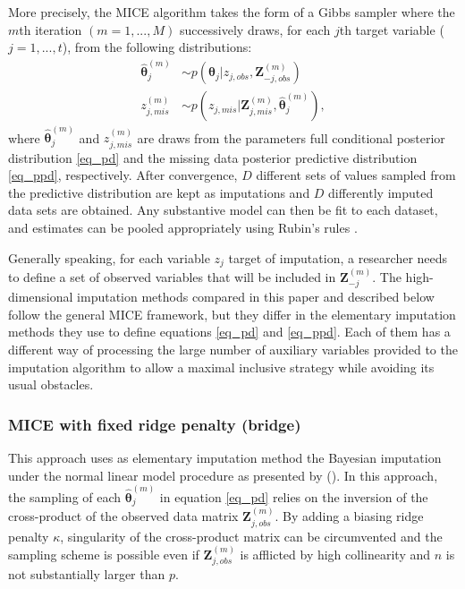 More precisely, the MICE algorithm takes the form of a Gibbs sampler where the $m$th iteration $(m = 1, ..., M)$
successively draws, for each $j$th target variable ($j = 1, ..., t$), from the following distributions:
%
	\begin{align}
	\hat{\bm{\theta}}_{j}^{(m)} &\sim 
		p(\bm{\theta}_j | z_{j, obs}, \bm{Z}_{-j, obs}^{(m)}) 
		\label{eq_pd}\\
	z_{j, mis}^{(m)} &\sim 
		p(z_{j, mis} | \bm{Z}_{j, mis}^{(m)}, \hat{\bm{\theta}}_{j}^{(m)}) 
		\label{eq_ppd},
	\end{align}
%
where $\hat{\bm{\theta}}_{j}^{(m)}$ and $z_{j, mis}^{(m)}$ are draws from the parameters full conditional posterior 
distribution \eqref{eq_pd} and the missing data posterior predictive distribution \eqref{eq_ppd}, respectively.
After convergence, $D$ different sets of values sampled from the predictive distribution are kept as imputations 
and $D$ differently imputed data sets are obtained. 
Any substantive model can then be fit to each dataset, and estimates can be pooled appropriately using Rubin's rules
\citep{rubin:1987}.

Generally speaking, for each variable $z_j$ target of imputation, a researcher needs to define a set of 
observed variables that will be included in $\bm{Z}_{-j}^{(m)}$.
The high-dimensional imputation methods compared in this paper and described below follow the general MICE framework,
but they differ in the elementary imputation methods they use to define equations \eqref{eq_pd} and \eqref{eq_ppd}.
Each of them has a different way of processing the large number of auxiliary variables provided to the 
imputation algorithm to allow a maximal inclusive strategy while avoiding its usual obstacles.

\subsubsection{MICE with fixed ridge penalty (bridge)}
	This approach uses as elementary imputation method the Bayesian imputation under the normal linear model 
	procedure as presented by \citeauthor{vanBuuren:2018} (\citeyear[p. 68, algorithm 3.1]{vanBuuren:2018}).
	In this approach, the sampling of each $\hat{\bm{\theta}}_{j}^{(m)}$ in equation \eqref{eq_pd} relies on the 
	inversion of the cross-product of the observed data matrix $\bm{Z}_{j, obs}^{(m)}$.
	By adding a biasing ridge penalty $\kappa$, singularity of the cross-product matrix can be circumvented and the 
	sampling scheme is possible even if $\bm{Z}_{j, obs}^{(m)}$ is afflicted by high collinearity and $n$ is not 
	substantially larger than $p$.

